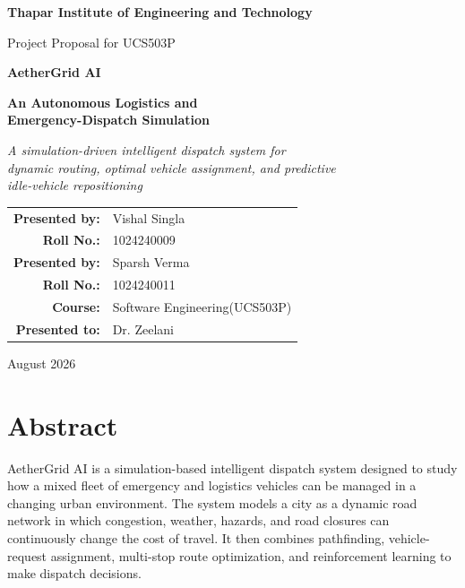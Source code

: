 \documentclass[12pt,a4paper]{article}
\begin{document}
\begin{titlepage}
\centering

\vspace*{1.5cm}

{\Large\bfseries Thapar Institute of Engineering and Technology}

\vspace{0.8cm}

{\large Project Proposal for UCS503P}

\vspace{1.5cm}

{\Huge\bfseries AetherGrid AI}

\vspace{0.4cm}

{\Large\bfseries An Autonomous Logistics and\\
Emergency-Dispatch Simulation}

\vspace{1.5cm}

{\large\itshape A simulation-driven intelligent dispatch system for\\
dynamic routing, optimal vehicle assignment, and predictive\\
idle-vehicle repositioning}

\vfill

\begin{tabular}{rl}
\textbf{Presented by:} & Vishal Singla \\
\textbf{Roll No.:} & 1024240009 \\
\textbf{Presented by:} & Sparsh Verma \\
\textbf{Roll No.:} & 1024240011 \\
\textbf{Course:} & Software Engineering(UCS503P)\\
\textbf{Presented to:} & Dr. Zeelani\\

\end{tabular}

\vspace{1.5cm}

{\large August 2026}

\end{titlepage}





\section{Abstract}

AetherGrid AI is a simulation-based intelligent dispatch system
designed to study how a mixed fleet of emergency and logistics
vehicles can be managed in a changing urban environment. The system
models a city as a dynamic road network in which congestion, weather,
hazards, and road closures can continuously change the cost of
travel. It then combines pathfinding, vehicle-request assignment,
multi-stop route optimization, and reinforcement learning to make
dispatch decisions.
\end{document}
